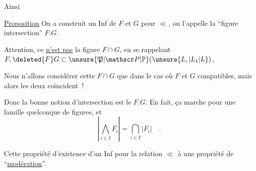 

Ainsi

\uline{Proposition} On a construit un Inf de $F$ et $G$ pour $\ll$, on l'appelle la ``figure intersection'' $F.G$.

Attention, ce \uline{n'est pas}  la figure $F\cap G$,  en se rappelant $F,\deleted{F}G\subset\unsure{\mathfrak P|\mathscr P|\mathbb P}(\unsure{L,|L_1|L})$, 

Nous n'allons considérer cette $F\cap G$ que dans le cas où $F$ et $G$ compatibles, mais alors les deux coïncident~!

Donc la bonne notion d'intersection est le $F.G$. En fait, ça marche pour une famille quelconque de figures, et
\[
 \left|\bigwedge_{i\in I} F_i\right|=\bigcap_{i\in I}|F_i|\quad .
\]

Cette propriété d'existence d'un Inf pour la relation $\ll$   à une propriété de ``\uline{modération}''.

